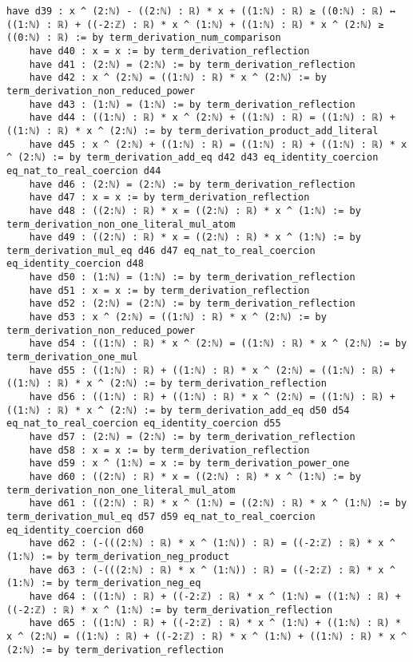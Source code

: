 \documentclass{article}
\begin{document}
\begin{tcolorbox}[colback=white!10, width=\linewidth]
\begin{lstlisting}[language=Lean4]
    have d39 : x ^ (2:ℕ) - ((2:ℕ) : ℝ) * x + ((1:ℕ) : ℝ) ≥ ((0:ℕ) : ℝ) ↔ ((1:ℕ) : ℝ) + ((-2:ℤ) : ℝ) * x ^ (1:ℕ) + ((1:ℕ) : ℝ) * x ^ (2:ℕ) ≥ ((0:ℕ) : ℝ) := by term_derivation_num_comparison
    have d40 : x = x := by term_derivation_reflection
    have d41 : (2:ℕ) = (2:ℕ) := by term_derivation_reflection
    have d42 : x ^ (2:ℕ) = ((1:ℕ) : ℝ) * x ^ (2:ℕ) := by term_derivation_non_reduced_power
    have d43 : (1:ℕ) = (1:ℕ) := by term_derivation_reflection
    have d44 : ((1:ℕ) : ℝ) * x ^ (2:ℕ) + ((1:ℕ) : ℝ) = ((1:ℕ) : ℝ) + ((1:ℕ) : ℝ) * x ^ (2:ℕ) := by term_derivation_product_add_literal
    have d45 : x ^ (2:ℕ) + ((1:ℕ) : ℝ) = ((1:ℕ) : ℝ) + ((1:ℕ) : ℝ) * x ^ (2:ℕ) := by term_derivation_add_eq d42 d43 eq_identity_coercion eq_nat_to_real_coercion d44
    have d46 : (2:ℕ) = (2:ℕ) := by term_derivation_reflection
    have d47 : x = x := by term_derivation_reflection
    have d48 : ((2:ℕ) : ℝ) * x = ((2:ℕ) : ℝ) * x ^ (1:ℕ) := by term_derivation_non_one_literal_mul_atom
    have d49 : ((2:ℕ) : ℝ) * x = ((2:ℕ) : ℝ) * x ^ (1:ℕ) := by term_derivation_mul_eq d46 d47 eq_nat_to_real_coercion eq_identity_coercion d48
    have d50 : (1:ℕ) = (1:ℕ) := by term_derivation_reflection
    have d51 : x = x := by term_derivation_reflection
    have d52 : (2:ℕ) = (2:ℕ) := by term_derivation_reflection
    have d53 : x ^ (2:ℕ) = ((1:ℕ) : ℝ) * x ^ (2:ℕ) := by term_derivation_non_reduced_power
    have d54 : ((1:ℕ) : ℝ) * x ^ (2:ℕ) = ((1:ℕ) : ℝ) * x ^ (2:ℕ) := by term_derivation_one_mul
    have d55 : ((1:ℕ) : ℝ) + ((1:ℕ) : ℝ) * x ^ (2:ℕ) = ((1:ℕ) : ℝ) + ((1:ℕ) : ℝ) * x ^ (2:ℕ) := by term_derivation_reflection
    have d56 : ((1:ℕ) : ℝ) + ((1:ℕ) : ℝ) * x ^ (2:ℕ) = ((1:ℕ) : ℝ) + ((1:ℕ) : ℝ) * x ^ (2:ℕ) := by term_derivation_add_eq d50 d54 eq_nat_to_real_coercion eq_identity_coercion d55
    have d57 : (2:ℕ) = (2:ℕ) := by term_derivation_reflection
    have d58 : x = x := by term_derivation_reflection
    have d59 : x ^ (1:ℕ) = x := by term_derivation_power_one
    have d60 : ((2:ℕ) : ℝ) * x = ((2:ℕ) : ℝ) * x ^ (1:ℕ) := by term_derivation_non_one_literal_mul_atom
    have d61 : ((2:ℕ) : ℝ) * x ^ (1:ℕ) = ((2:ℕ) : ℝ) * x ^ (1:ℕ) := by term_derivation_mul_eq d57 d59 eq_nat_to_real_coercion eq_identity_coercion d60
    have d62 : (-(((2:ℕ) : ℝ) * x ^ (1:ℕ)) : ℝ) = ((-2:ℤ) : ℝ) * x ^ (1:ℕ) := by term_derivation_neg_product
    have d63 : (-(((2:ℕ) : ℝ) * x ^ (1:ℕ)) : ℝ) = ((-2:ℤ) : ℝ) * x ^ (1:ℕ) := by term_derivation_neg_eq
    have d64 : ((1:ℕ) : ℝ) + ((-2:ℤ) : ℝ) * x ^ (1:ℕ) = ((1:ℕ) : ℝ) + ((-2:ℤ) : ℝ) * x ^ (1:ℕ) := by term_derivation_reflection
    have d65 : ((1:ℕ) : ℝ) + ((-2:ℤ) : ℝ) * x ^ (1:ℕ) + ((1:ℕ) : ℝ) * x ^ (2:ℕ) = ((1:ℕ) : ℝ) + ((-2:ℤ) : ℝ) * x ^ (1:ℕ) + ((1:ℕ) : ℝ) * x ^ (2:ℕ) := by term_derivation_reflection

\end{lstlisting}
\end{tcolorbox}
\end{document}
